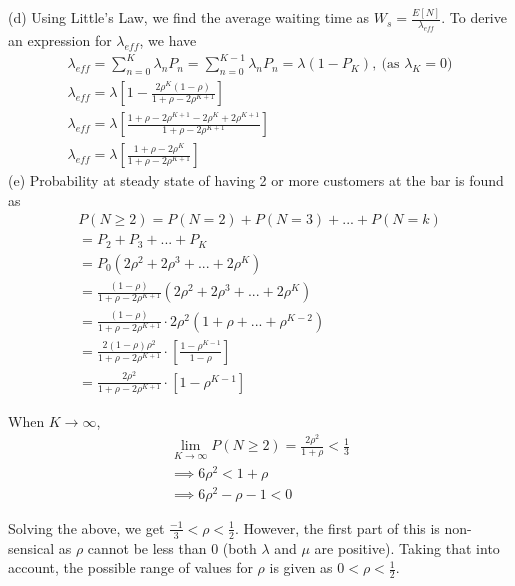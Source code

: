 (d) Using Little's Law, we find the average waiting time as $W_s = \frac{E[N]}{\lambda_{eff}}$. To derive an expression for $\lambda_{eff}$, we have
\begin{gather*}
\lambda_{eff} = \sum_{n=0}^{K}\lambda_n P_n = \sum_{n=0}^{K-1}\lambda_n P_n = \lambda(1-P_K),\ \text{(as $\lambda_K = 0)$}\\
\lambda_{eff} = \lambda \left[1 - \frac{2\rho^K(1-\rho)}{1 + \rho - 2\rho^{K+1}} \right]\\
\lambda_{eff} = \lambda \left[\frac{1 + \rho - 2\rho^{K+1} - 2\rho^K +2\rho^{K+1}}{1 + \rho - 2\rho^{K+1}} \right]\\
\lambda_{eff} = \lambda \left[\frac{1 + \rho - 2\rho^K}{1 + \rho - 2\rho^{K+1}} \right]
\end{gather*}
(e) Probability at steady state of having 2 or more customers at the bar is found as
\begin{gather*}
P(N\ge2) = P(N=2) + P(N=3) + ... + P(N=k)\\
=P_2 + P_3 + ... + P_K\\
=P_0(2\rho^2 + 2\rho^3 + ...+ 2\rho^K)\\
=\frac{(1-\rho)}{1 + \rho - 2\rho^{K+1}}(2\rho^2 + 2\rho^3 + ... + 2\rho^K)\\
=\frac{(1-\rho)}{1 + \rho - 2\rho^{K+1}}\cdot 2\rho^2(1 + \rho + ...+ \rho^{K-2})\\
=\frac{2(1-\rho)\rho^2}{1 + \rho - 2\rho^{K+1}}\cdot\left[\frac{1-\rho^{K-1}}{1-\rho}\right]\\
=\frac{2\rho^2}{1 + \rho - 2\rho^{K+1}}\cdot\left[1-\rho^{K-1}\right]
\end{gather*}

When $K\to\infty$,
\begin{gather*}
\lim_{K\to\infty}P(N\ge2) = \frac{2\rho^2}{1 + \rho} < \frac{1}{3}\\
\implies 6\rho^2 < 1 + \rho\\
\implies 6\rho^2 - \rho - 1< 0
\end{gather*}

Solving the above, we get $\frac{-1}{3}<\rho<\frac{1}{2}$. However, the first part of this is non-sensical as $\rho$ cannot be less than 0 (both $\lambda$ and $\mu$ are positive). Taking that into account, the possible range of values for $\rho$ is given as $0 < \rho < \frac{1}{2}$.